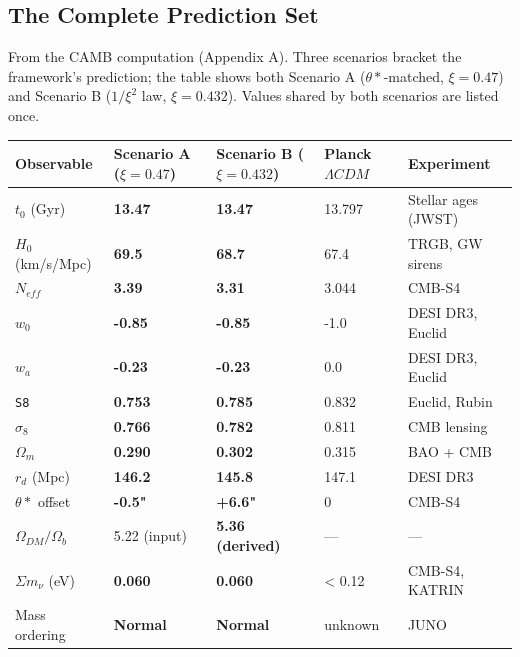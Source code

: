 \documentclass[aps,prd,preprint,superscriptaddress,longbibliography]{revtex4-2}
\begin{document}
\subsection{The Complete Prediction Set}

From the CAMB computation (Appendix A). Three scenarios bracket the framework's prediction; the table shows both Scenario A ($\theta*$-matched, $\xi = 0.47$) and Scenario B ($1/\xi^{2}$ law, $\xi = 0.432$). Values shared by both scenarios are listed once.


\begin{table}[H]
\begin{ruledtabular}
\begin{tabular}{p{3.0cm}p{3.0cm}p{3.0cm}p{3.0cm}p{3.0cm}}
Observable & Scenario A ($\xi=0.47$) & Scenario B ($\xi=0.432$) & Planck $\Lambda CDM$ & Experiment \\
\hline
$t_{0}$ (Gyr) & \textbf{13.47} & \textbf{13.47} & 13.797 & Stellar ages (JWST) \\
$H_{0}$ (km/s/Mpc) & \textbf{69.5} & \textbf{68.7} & 67.4 & TRGB, GW sirens \\
$N_{eff}$ & \textbf{3.39} & \textbf{3.31} & 3.044 & CMB-S4 \\
$w_{0}$ & \textbf{-0.85} & \textbf{-0.85} & -1.0 & DESI DR3, Euclid \\
$w_a$ & \textbf{-0.23} & \textbf{-0.23} & 0.0 & DESI DR3, Euclid \\
\texttt{S8} & \textbf{0.753} & \textbf{0.785} & 0.832 & Euclid, Rubin \\
$\sigma_{8}$ & \textbf{0.766} & \textbf{0.782} & 0.811 & CMB lensing \\
$\Omega_m$ & \textbf{0.290} & \textbf{0.302} & 0.315 & BAO + CMB \\
$r_d$ (Mpc) & \textbf{146.2} & \textbf{145.8} & 147.1 & DESI DR3 \\
$\theta*$ offset & \textbf{-0.5"} & \textbf{+6.6"} & 0 & CMB-S4 \\
$\Omega_{DM}/\Omega_b$ & 5.22 (input) & \textbf{5.36 (derived)} & --- & --- \\
$\Sigma m_\nu$ (eV) & \textbf{0.060} & \textbf{0.060} & < 0.12 & CMB-S4, KATRIN \\
Mass ordering & \textbf{Normal} & \textbf{Normal} & unknown & JUNO \\
\end{tabular}
\end{ruledtabular}
\end{table}
\end{document}
